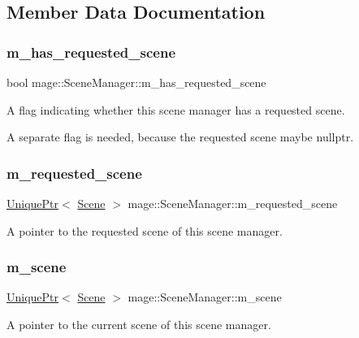 \subsection{Member Data Documentation}
\hypertarget{classmage_1_1_scene_manager_aff9889d9fc53a3524b0e88d10cd544d6}{}\label{classmage_1_1_scene_manager_aff9889d9fc53a3524b0e88d10cd544d6} 
\subsubsection{\texorpdfstring{m\+\_\+has\+\_\+requested\+\_\+scene}{m\_has\_requested\_scene}}
{\footnotesize\ttfamily bool mage\+::\+Scene\+Manager\+::m\+\_\+has\+\_\+requested\+\_\+scene\hspace{0.3cm}{\ttfamily [private]}}

A flag indicating whether this scene manager has a requested scene.

A separate flag is needed, because the requested scene maybe {\ttfamily nullptr}. \hypertarget{classmage_1_1_scene_manager_a74bdb7b0805208b039991e9b9abc741f}{}\label{classmage_1_1_scene_manager_a74bdb7b0805208b039991e9b9abc741f} 
\subsubsection{\texorpdfstring{m\+\_\+requested\+\_\+scene}{m\_requested\_scene}}
{\footnotesize\ttfamily \hyperlink{namespacemage_a3316d7143a973e37adf1110f2e80ca31}{Unique\+Ptr}$<$ \hyperlink{classmage_1_1_scene}{Scene} $>$ mage\+::\+Scene\+Manager\+::m\+\_\+requested\+\_\+scene\hspace{0.3cm}{\ttfamily [private]}}

A pointer to the requested scene of this scene manager. \hypertarget{classmage_1_1_scene_manager_a774c610dba3ece25acf97915b6368a1a}{}\label{classmage_1_1_scene_manager_a774c610dba3ece25acf97915b6368a1a} 
\subsubsection{\texorpdfstring{m\+\_\+scene}{m\_scene}}
{\footnotesize\ttfamily \hyperlink{namespacemage_a3316d7143a973e37adf1110f2e80ca31}{Unique\+Ptr}$<$ \hyperlink{classmage_1_1_scene}{Scene} $>$ mage\+::\+Scene\+Manager\+::m\+\_\+scene\hspace{0.3cm}{\ttfamily [private]}}

A pointer to the current scene of this scene manager. 